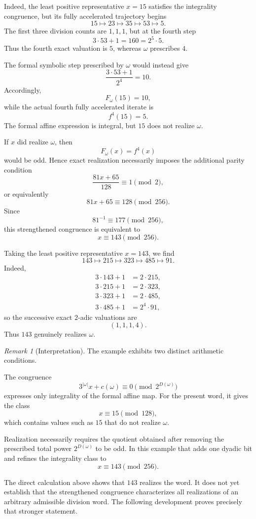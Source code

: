 \documentclass[12pt, oneside]{article}
\numberwithin{equation}{section}
\theoremstyle{definition}
\theoremstyle{plain}
\theoremstyle{remark}
\newtheorem*{remark}{Remark}
\begin{document}
Indeed, the least positive representative \(x=15\) satisfies the
integrality congruence, but its fully accelerated trajectory begins
\[
15\longmapsto23\longmapsto35\longmapsto53\longmapsto5.
\]
The first three division counts are \(1,1,1\), but at the fourth step
\[
3\cdot53+1
=
160
=
2^5\cdot5.
\]
Thus the fourth exact valuation is \(5\), whereas \(\omega\) prescribes
\(4\).

The formal symbolic step prescribed by \(\omega\) would instead give
\[
\frac{3\cdot53+1}{2^4}
=
10.
\]
Accordingly,
\[
F_\omega(15)=10,
\]
while the actual fourth fully accelerated iterate is
\[
f^4(15)=5.
\]
The formal affine expression is integral, but \(15\) does not realize
\(\omega\).

If \(x\) did realize \(\omega\), then
\[
F_\omega(x)=f^4(x)
\]
would be odd. Hence exact realization necessarily imposes the additional
parity condition
\[
\frac{81x+65}{128}\equiv1\pmod2,
\]
or equivalently
\[
81x+65\equiv128\pmod{256}.
\]
Since
\[
81^{-1}\equiv177\pmod{256},
\]
this strengthened congruence is equivalent to
\[
x\equiv143\pmod{256}.
\]

Taking the least positive representative \(x=143\), we find
\[
143\longmapsto215\longmapsto323\longmapsto485\longmapsto91.
\]
Indeed,
\[
\begin{aligned}
3\cdot143+1 &= 2\cdot215,\\
3\cdot215+1 &= 2\cdot323,\\
3\cdot323+1 &= 2\cdot485,\\
3\cdot485+1 &= 2^4\cdot91,
\end{aligned}
\]
so the successive exact \(2\)-adic valuations are
\[
(1,1,1,4).
\]
Thus \(143\) genuinely realizes \(\omega\).

\begin{remark}[Interpretation]
The example exhibits two distinct arithmetic conditions.

The congruence
\[
3^{|\omega|}x+c(\omega)
\equiv0
\pmod{2^{D(\omega)}}
\]
expresses only integrality of the formal affine map. For the present word,
it gives the class
\[
x\equiv15\pmod{128},
\]
which contains values such as \(15\) that do not realize \(\omega\).

Realization necessarily requires the quotient obtained after removing the
prescribed total power \(2^{D(\omega)}\) to be odd. In this example that
adds one dyadic bit and refines the integrality class to
\[
x\equiv143\pmod{256}.
\]

The direct calculation above shows that \(143\) realizes the word. It does
not yet establish that the strengthened congruence characterizes all
realizations of an arbitrary admissible division word. The following
development proves precisely that stronger statement.
\end{remark}
\end{document}
